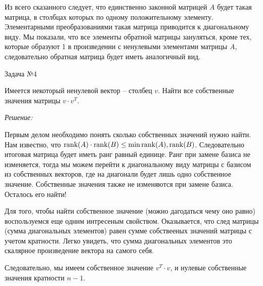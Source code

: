 \documentclass[10pt]{article}
\begin{document}
Из всего сказанного следует, что единственно законной матрицей $A$ будет такая матрица, в столбцах которых по одному положительному элементу. Элементарными преобразованиями такая матрица приводится к диагональному виду. Мы показали, что все элементы обратной матрицы зануляться, кроме тех, которые образуют 1 в произведении с ненулевыми элементами матрицы $A$, следовательно обратная матрица будет иметь аналогичный вид. 

\hspace{2mm}

Задача №4

Имеется некоторый ненулевой вектор -- столбец $v$. Найти все собственные значения матрицы $v\cdot v^T$.

\textit{Решение:}

Первым делом необходимо понять сколько собственных значений нужно найти. Нам известно, что $\operatorname{rank}(A) \cdot \operatorname{rank}(B) \leq \min {\operatorname{rank}(A), \operatorname{rank}(B)}$. Следовательно итоговая матрица будет иметь ранг равный единице. Ранг при замене базиса не изменяется, тогда мы можем перейти к диагональному виду матрицы с базисом из собственных векторов, где на диагонали будет лишь одно собственное значение. Собственные значения также не изменяются при замене базиса. Осталось его найти! 

Для того, чтобы найти собственное значение (можно дагодаться чему оно равно) воспользуемся еще одним интресеным свойством. Оказывается, что след матрицы (сумма диагональных элементов) равен сумме собствееных значений матрицы с учетом кратности. Легко увидеть, что сумма диагональных элементов это скалярное произведение вектора на самого себя.

Следовательно, мы имеем собственное значение $v^T\cdot v$, и нулевые собственные значения кратности $n - 1$.
\end{document}

